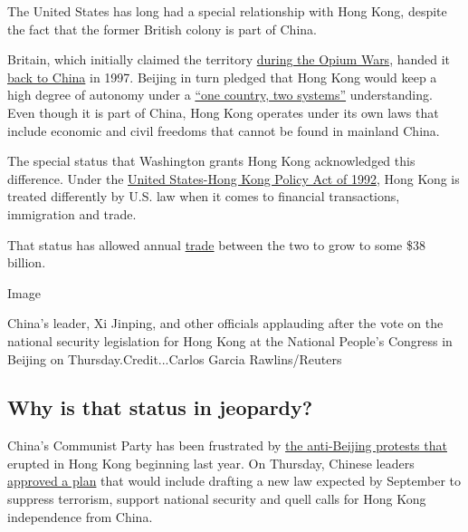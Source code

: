 The United States has long had a special relationship with Hong Kong,
despite the fact that the former British colony is part of China.

Britain, which initially claimed the territory
\href{https://www.nytimes3xbfgragh.onion/2018/07/03/world/asia/opium-war-book-china-britain.html}{during
the Opium Wars}, handed it
\href{https://www.nytimes3xbfgragh.onion/2019/07/01/world/asia/hong-kong-china-handover.html}{back
to China} in 1997. Beijing in turn pledged that Hong Kong would keep a
high degree of autonomy under a
\href{https://www.nytimes3xbfgragh.onion/2014/09/30/world/asia/the-hong-kong-protests-what-you-should-know.html}{``one
country, two systems''} understanding. Even though it is part of China,
Hong Kong operates under its own laws that include economic and civil
freedoms that cannot be found in mainland China.

The special status that Washington grants Hong Kong acknowledged this
difference. Under the
\href{https://www.nytimes3xbfgragh.onion/1997/07/02/world/uncle-sam-s-new-role-hong-kong-s-advocate.html}{United
States-Hong Kong Policy Act of 1992}, Hong Kong is treated differently
by U.S. law when it comes to financial transactions, immigration and
trade.

That status has allowed annual
\href{https://hk.usconsulate.gov/n-2019032101/}{trade} between the two
to grow to some \$38 billion.

Image

China's leader, Xi Jinping, and other officials applauding after the
vote on the national security legislation for Hong Kong at the National
People's Congress in Beijing on Thursday.Credit...Carlos Garcia
Rawlins/Reuters

\hypertarget{why-is-that-status-in-jeopardy}{%
\subsection{Why is that status in
jeopardy?}\label{why-is-that-status-in-jeopardy}}

China's Communist Party has been frustrated by
\href{https://www.nytimes3xbfgragh.onion/2020/05/27/world/asia/why-are-hong-kong-protesters.html}{the
anti-Beijing protests that} erupted in Hong Kong beginning last year. On
Thursday, Chinese leaders
\href{https://www.nytimes3xbfgragh.onion/2020/05/28/world/asia/china-hong-kong-crackdown.html}{approved
a plan} that would include drafting a new law expected by September to
suppress terrorism, support national security and quell calls for Hong
Kong independence from China.

